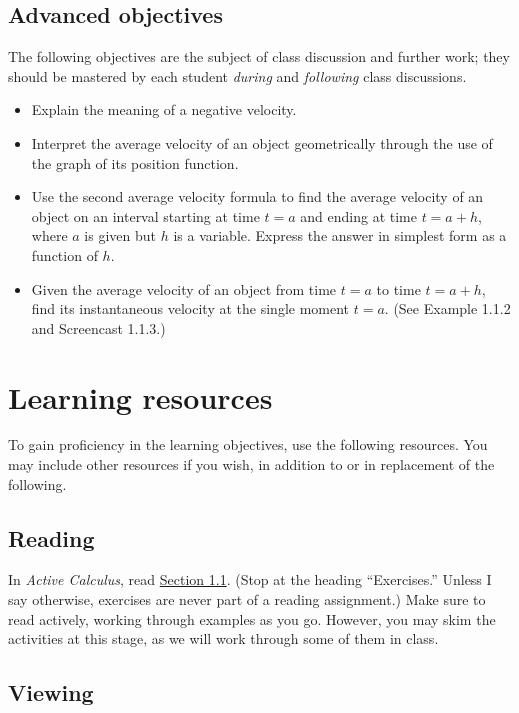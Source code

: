 \documentclass{ximera}
\begin{document}
\subsection*{Advanced objectives}

The following objectives are the subject of class discussion and
further work; they should be mastered by each student \emph{during}
and \emph{following} class discussions.\par

\begin{itemize}
\item Explain the meaning of a negative velocity.
\item Interpret the average velocity of an object geometrically
  through the use of the graph of its position function.
\item Use the second average velocity formula to find the average
  velocity of an object on an interval starting at time $t=a$ and
  ending at time $t=a+h$, where $a$ is given but $h$ is a
  variable. Express the answer in simplest form as a function of $h$.
\item Given the average velocity of an object from time $t=a$ to time $t=a+h$, find its
  instantaneous velocity at the single moment $t=a$. (See Example 1.1.2 and
  Screencast 1.1.3.)
\end{itemize}

\section*{Learning resources}
To gain proficiency in the learning objectives, use the following
resources. You may include other resources if you wish, in addition to
or in replacement of the following.

\subsection*{Reading}
In \emph{Active Calculus}, read
\href{https://activecalculus.org/single/sec-1-1-vel.html}{Section
  1.1}. (Stop at the heading ``Exercises.'' Unless I say otherwise,
exercises are never part of a reading assignment.) Make sure to read
actively, working through examples as you go. However, you may skim
the activities at this stage, as we will work through some of them in
class.\par

\subsection*{Viewing}
\end{document}
